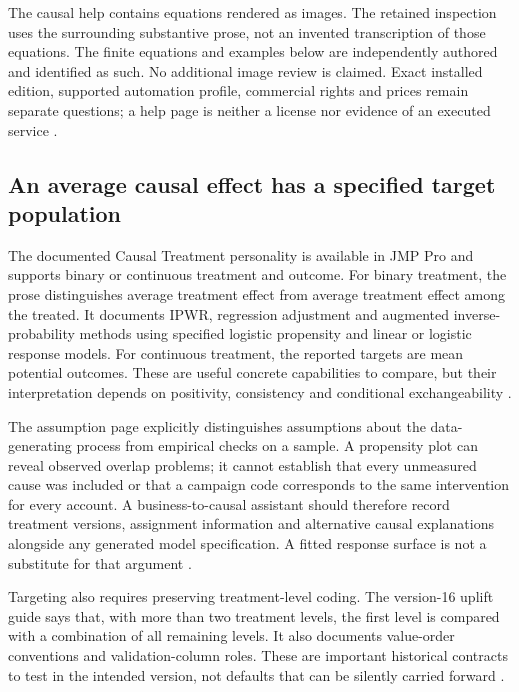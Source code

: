 The causal help contains equations rendered as images. The retained
inspection uses the surrounding substantive prose, not an invented
transcription of those equations. The finite equations and examples below
are independently authored and identified as such. No additional image
review is claimed. Exact installed edition, supported automation profile,
commercial rights and prices remain separate questions; a help page is
neither a license nor evidence of an executed service
\citep{exec24_jmp_choice}.

\subsection{An average causal effect has a specified target population}
The documented Causal Treatment personality is available in JMP Pro and
supports binary or continuous treatment and outcome. For binary treatment,
the prose distinguishes average treatment effect from average treatment
effect among the treated. It documents IPWR, regression adjustment and
augmented inverse-probability methods using specified logistic propensity
and linear or logistic response models. For continuous treatment, the
reported targets are mean potential outcomes. These are useful concrete
capabilities to compare, but their interpretation depends on positivity,
consistency and conditional exchangeability
\citep{exec13_ch_jmp_causal}.

The assumption page explicitly distinguishes assumptions about the
data-generating process from empirical checks on a sample. A propensity
plot can reveal observed overlap problems; it cannot establish that every
unmeasured cause was included or that a campaign code corresponds to the
same intervention for every account. A business-to-causal assistant should
therefore record treatment versions, assignment information and alternative
causal explanations alongside any generated model specification. A fitted
response surface is not a substitute for that argument
\citep{exec13_ch_jmp_causal,exec24_jmp_choice}.

Targeting also requires preserving treatment-level coding. The version-16
uplift guide says that, with more than two treatment levels, the first
level is compared with a combination of all remaining levels. It also
documents value-order conventions and validation-column roles. These are
important historical contracts to test in the intended version, not
defaults that can be silently carried forward
\citep{exec13_ch_jmp_uplift}.

